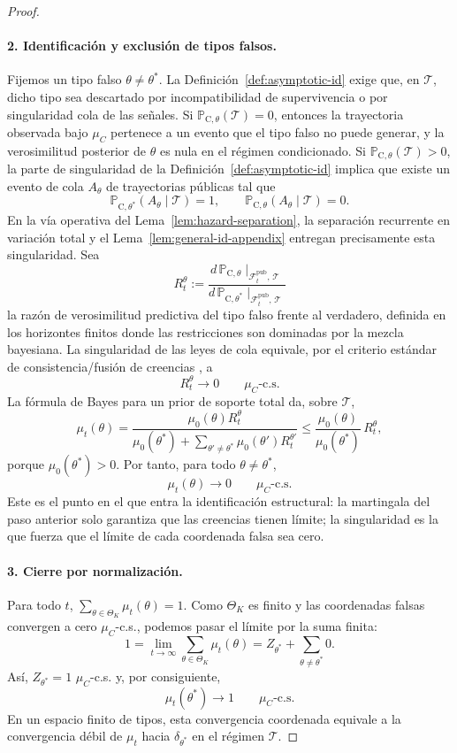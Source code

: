 \documentclass[12pt]{article}
\providecommand{\textcite}{\citet}
\theoremstyle{definition}
\theoremstyle{remark}
\newcommand{\ProbC}[1]{\mathbb{P}_{\mathrm{C},#1}}
\newcommand{\1}{\mathbf{1}}
\begin{document}
\begin{proof}
\paragraph{2. Identificación y exclusión de tipos falsos.}
Fijemos un tipo falso $\theta\neq\theta^\ast$. La Definición~\ref{def:asymptotic-id} exige que, en $\mathcal{T}$, dicho tipo sea descartado por incompatibilidad de supervivencia o por singularidad cola de las señales. Si $\ProbC{\theta}(\mathcal{T})=0$, entonces la trayectoria observada bajo $\mu_C$ pertenece a un evento que el tipo falso no puede generar, y la verosimilitud posterior de $\theta$ es nula en el régimen condicionado. Si $\ProbC{\theta}(\mathcal{T})>0$, la parte de singularidad de la Definición~\ref{def:asymptotic-id} implica que existe un evento de cola $A_\theta$ de trayectorias públicas tal que
\[
\ProbC{\theta^\ast}(A_\theta\mid\mathcal{T})=1,
\qquad
\ProbC{\theta}(A_\theta\mid\mathcal{T})=0.
\]
En la vía operativa del Lema~\ref{lem:hazard-separation}, la separación recurrente en variación total y el Lema~\ref{lem:general-id-appendix} entregan precisamente esta singularidad. Sea
\[
R_t^\theta
:=
\frac{d\,\ProbC{\theta}\!\mid_{\mathcal{F}_t^{\mathrm{pub}},\,\mathcal{T}}}
     {d\,\ProbC{\theta^\ast}\!\mid_{\mathcal{F}_t^{\mathrm{pub}},\,\mathcal{T}}}
\]
la razón de verosimilitud predictiva del tipo falso frente al verdadero, definida en los horizontes finitos donde las restricciones son dominadas por la mezcla bayesiana. La singularidad de las leyes de cola equivale, por el criterio estándar de consistencia/fusión de creencias \textcite{BlackwellDubins1962,Schervish1995Theory}, a
\[
R_t^\theta \longrightarrow 0
\qquad \mu_C\text{-c.s.}
\]
La fórmula de Bayes para un prior de soporte total da, sobre $\mathcal{T}$,
\[
\mu_t(\theta)
=
\frac{\mu_0(\theta)R_t^\theta}
{\mu_0(\theta^\ast)+\sum_{\theta'\neq\theta^\ast}\mu_0(\theta')R_t^{\theta'}}
\le
\frac{\mu_0(\theta)}{\mu_0(\theta^\ast)}\,R_t^\theta,
\]
porque $\mu_0(\theta^\ast)>0$. Por tanto, para todo $\theta\neq\theta^\ast$,
\[
\mu_t(\theta)\longrightarrow 0
\qquad \mu_C\text{-c.s.}
\]
Este es el punto en el que entra la identificación estructural: la martingala del paso anterior solo garantiza que las creencias tienen límite; la singularidad es la que fuerza que el límite de cada coordenada falsa sea cero.

\paragraph{3. Cierre por normalización.}
Para todo $t$, $\sum_{\theta\in\Theta_K}\mu_t(\theta)=1$. Como $\Theta_K$ es finito y las coordenadas falsas convergen a cero $\mu_C$-c.s., podemos pasar el límite por la suma finita:
\[
1=\lim_{t\to\infty}\sum_{\theta\in\Theta_K}\mu_t(\theta)
=Z_{\theta^\ast}+\sum_{\theta\neq\theta^\ast}0.
\]
Así, $Z_{\theta^\ast}=1$ $\mu_C$-c.s. y, por consiguiente,
\[
\mu_t(\theta^\ast)\longrightarrow 1
\qquad \mu_C\text{-c.s.}
\]
En un espacio finito de tipos, esta convergencia coordenada equivale a la convergencia débil de $\mu_t$ hacia $\delta_{\theta^\ast}$ en el régimen $\mathcal{T}$.
\end{proof}
\end{document}
